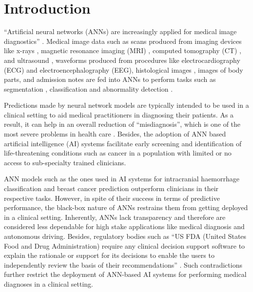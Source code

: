 \documentclass[../report.tex]{subfiles}
\begin{document}
    \chapter{Introduction}\label{ch_intro}
    \noindent
	 \enquote {Artificial neural networks (ANNs) are increasingly applied for medical image diagnostics} \cite{anwar2018medical}. Medical image data such as scans produced from imaging devices like x-rays \cite{ozturk2020automated}, magnetic resonance imaging (MRI) \cite{xue2012window}, computed tomography (CT) \cite{lee2019explainable}, and ultrasound \cite{qian2021prospective}, waveforms produced from procedures like electrocardiography (ECG) \cite{hicks2021explaining} and electroencephalography (EEG), histological images \cite{binder2021morphological}, images of body parts, and admission notes \cite{li2017convolutional} are fed into ANNs to perform tasks such as segmentation \cite{Schwendicke2019}, classification \cite{Gurovich2019} and abnormality detection \cite{binder2021morphological}.
	
	Predictions made by neural network models are typically intended to be used in a clinical setting to aid medical practitioners in diagnosing their patients. As a result, it can help in an overall reduction of \enquote{misdiagnosis}, which is one of the most severe problems in health care \cite{li2017convolutional}. Besides, the adoption of ANN based artificial intelligence (AI) systems facilitate early screening and identification of life-threatening conditions such as cancer in a population with limited or no access to sub-specialty trained clinicians.
	
	ANN models such as the ones used in AI systems for intracranial haemorrhage classification \cite{lee2019explainable} and breast cancer prediction  \cite{mckinney2020international} outperform clinicians in their respective tasks. However, in spite of their success in terms of predictive performance, the black-box nature of ANNs restrains them from getting deployed in a clinical setting. Inherently, ANNs lack transparency and therefore are considered less dependable for high stake applications like medical diagnosis and autonomous driving. Besides, regulatory bodies such as \enquote{US FDA (United States Food and Drug Administration) require any clinical decision support software to explain the rationale or support for its decisions to enable the users to independently review the basis of their recommendations} \cite{lee2019explainable}. Such contradictions further restrict the deployment of ANN-based AI systems for performing medical diagnoses in a clinical setting.
	
\end{document}

